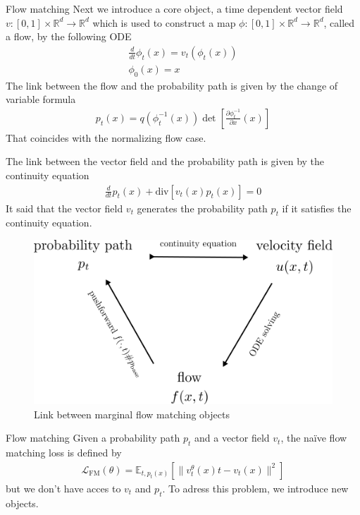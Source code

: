 \documentclass{beamer}
\begin{document}
\begin{frame}{Flow matching}
    Next we introduce a core object, a time dependent vector field \(v:[0,1]\times\mathbb{R}^d\rightarrow \mathbb{R}^d\) which is used to construct a map \(\phi:[0,1]\times\mathbb{R}^d\rightarrow\mathbb{R}^d\), called a flow, by the following ODE
    \begin{align}
        \frac{d}{dt}\phi_t(x)=v_t(\phi_t(x)) \\
        \phi_0(x)=x \nonumber
    \end{align}
    The link between the flow and the probability path is given by the change of variable formula
    \begin{align}
        p_t(x)=q(\phi_t^{-1}(x))\det \left[\frac{\partial\phi_t^{-1}}{\partial x}(x)\right]
    \end{align}
    That coincides with the normalizing flow case.
\end{frame}

\begin{frame}
    The link between the vector field and the probability path is given by the continuity equation 
    \begin{align}
        \frac{d}{dt}p_t(x)+\text{div}\left[v_t(x)p_t(x)\right]=0
    \end{align}
    It said that the vector field \(v_t\) generates the probability path \(p_t\) if it satisfies the continuity equation.\\

    \begin{figure}[b]
        \centering
        \includegraphics[width=0.7\linewidth]{images/trifecta.png}
        \caption{Link between marginal flow matching objects}
        \label{fig:flow_matching}
    \end{figure}
\end{frame}

\begin{frame}{Flow matching}
    Given a probability path \(p_t\) and a vector field \(v_t\), the naïve flow matching loss is defined by
    \begin{align}
        \mathcal{L}_\text{FM}(\theta)=\mathbb{E}_{t,p_t(x)}\left[ \| v_t^\theta(x)t-v_t(x)\|^2 \right]
    \end{align}
    but we don't have acces to \(v_t\) and \(p_t\).
    \bigskip
    To adress this problem, we introduce new objects. 
\end{frame}
\end{document}
